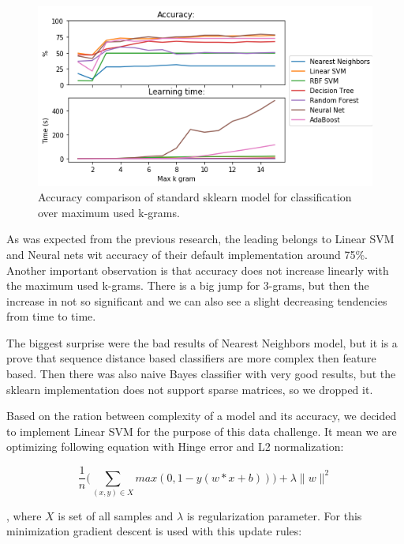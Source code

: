 \documentclass{article}
\begin{document}
\begin{figure}[h]
    \centering
    \includegraphics[width=1\textwidth]{imgs/limitedSparseKgramsAccuracyTime.png}
    \caption{Accuracy comparison of standard sklearn model for classification over maximum used k-grams.}
    \label{fig:standard_models_coparison}
\end{figure}

As was expected from the previous research, the leading belongs to Linear SVM and Neural nets wit accuracy of their default implementation around 75\%. Another important observation is that accuracy does not increase linearly with the maximum used k-grams. There is a big jump for 3-grams, but then the increase in not so significant and we can also see a slight decreasing tendencies from time to time. 

The biggest surprise were the bad results of Nearest Neighbors model, but it is a prove that sequence distance based classifiers are more complex then feature based. Then there was also naive Bayes classifier with very good results, but the sklearn implementation does not support sparse matrices, so we dropped it.

Based on the ration between complexity of a model and its accuracy, we decided to implement Linear SVM for the purpose of this data challenge. It mean we are optimizing following equation with Hinge error and L2 normalization:

\begin{equation}\label{eq:svm}
\frac{1}{n}\Big(\sum_{(x, y) \in X} max(0, 1 - y (w * x + b))\Big) + \lambda \| w \|^2
\end{equation}

, where $X$ is set of all samples and $\lambda$ is regularization parameter. For this minimization gradient descent is used with this update rules:
\end{document}

